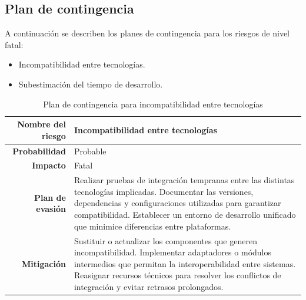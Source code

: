 \subsection{Plan de contingencia}

A continuación se describen los planes de contingencia para los riesgos de nivel fatal:
\begin{itemize}
	\item[RT3] Incompatibilidad entre tecnologías.
	\item[RE1] Subestimación del tiempo de desarrollo. 
\end{itemize}

\begin{table}[H]
	\centering
	\renewcommand{\arraystretch}{1.2}
	\setlength{\tabcolsep}{4pt}
	\begin{tabular}{r|p{}}
		\hline
		\textbf{Nombre del riesgo} & \textbf{Incompatibilidad entre tecnologías} \\ \hline
		\textbf{Probabilidad} & Probable \\ \hline
		\textbf{Impacto} & Fatal \\ \hline
		\textbf{Plan de evasión} & 
		Realizar pruebas de integración tempranas entre las distintas tecnologías implicadas. 
		Documentar las versiones, dependencias y configuraciones utilizadas para garantizar compatibilidad.
		Establecer un entorno de desarrollo unificado que minimice diferencias entre plataformas. \\ \hline
		\textbf{Mitigación} & 
		Sustituir o actualizar los componentes que generen incompatibilidad. 
		Implementar adaptadores o módulos intermedios que permitan la interoperabilidad entre sistemas. 
		Reasignar recursos técnicos para resolver los conflictos de integración y evitar retrasos prolongados. \\ 
	\end{tabular}
	\caption{Plan de contingencia para incompatibilidad entre tecnologías}
	\label{table:contingencia_incompatibilidad}
\end{table}

